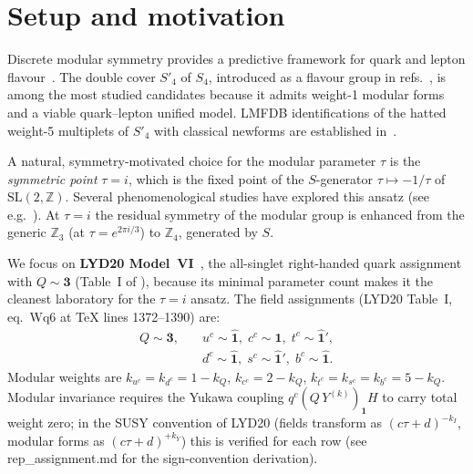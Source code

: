 \documentclass[a4paper,11pt]{article}
\newcommand{\Spf}{S'_4}
\begin{document}
\section{Setup and motivation}
\label{sec:setup}

Discrete modular symmetry provides a predictive framework for quark
and lepton flavour~\cite{Feruglio2017}.  The double cover
$\Spf$ of $S_4$, introduced as a flavour group in
refs.~\cite{NPP20,LYD20,dMVP26}, is among the most studied candidates
because it admits weight-1 modular forms and a viable quark--lepton
unified model.  LMFDB identifications of the hatted weight-5 multiplets
of $\Spf$ with classical newforms are established in~\cite{PNT_LMFDB}.

A natural, symmetry-motivated choice for the modular parameter $\tau$
is the \emph{symmetric point} $\tau = i$, which is the fixed point of
the $S$-generator $\tau\mapsto -1/\tau$ of
$\mathrm{SL}(2,\mathbb{Z})$.  Several phenomenological studies have
explored this ansatz (see e.g.~\cite{dMVP26,DuWang22,AbbasKhalil22}).
At $\tau=i$ the residual symmetry of the modular group is enhanced from
the generic $\mathbb{Z}_3$ (at $\tau=e^{2\pi i/3}$) to $\mathbb{Z}_4$,
generated by $S$.

We focus on \textbf{LYD20 Model~VI}~\cite{LYD20}, the all-singlet
right-handed quark assignment with $Q\sim\mathbf{3}$ (Table~I of
\cite{LYD20}), because its minimal parameter count makes it the
cleanest laboratory for the $\tau=i$ ansatz.  The field assignments
(LYD20 Table~I, eq.~Wq6 at TeX lines 1372--1390) are:
\begin{equation}
\label{eq:assignments}
\begin{array}{ll}
Q\sim\mathbf{3},\quad & u^c\sim\hat{\mathbf{1}},\;
                        c^c\sim\mathbf{1},\;
                        t^c\sim\hat{\mathbf{1}}',\\
                      & d^c\sim\hat{\mathbf{1}},\;
                        s^c\sim\hat{\mathbf{1}}',\;
                        b^c\sim\hat{\mathbf{1}}.
\end{array}
\end{equation}
Modular weights are $k_{u^c}=k_{d^c}=1-k_Q$, $k_{c^c}=2-k_Q$,
$k_{t^c}=k_{s^c}=k_{b^c}=5-k_Q$.  Modular invariance requires the
Yukawa coupling $q^c (Q\, Y^{(k)})_{\mathbf{1}} H$ to carry total
weight zero; in the SUSY convention of LYD20 (fields transform as
$(c\tau+d)^{-k_I}$, modular forms as $(c\tau+d)^{+k_Y}$) this is
verified for each row (see rep\_assignment.md for the sign-convention
derivation).
\end{document}
